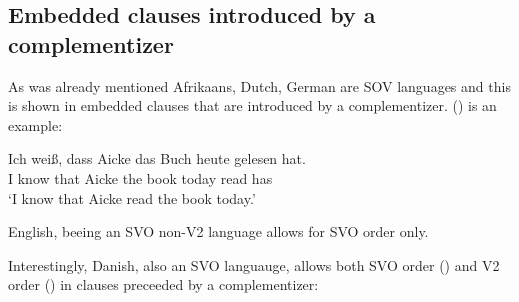 \subsection{Embedded clauses introduced by a complementizer}

As was already mentioned Afrikaans, Dutch, German are SOV languages and this is shown in embedded
clauses that are introduced by a complementizer. () is an example:

\ea
\gll Ich weiß, dass Aicke das Buch heute gelesen hat.\\
     I know that Aicke the book today read has\\
\glt `I know that Aicke read the book today.'
\z



English, beeing an SVO non-V2 language allows for SVO order only.
\z

Interestingly, Danish, also an SVO languauge, allows both SVO order () and V2 order () in clauses
preceeded by a complementizer:
\z

